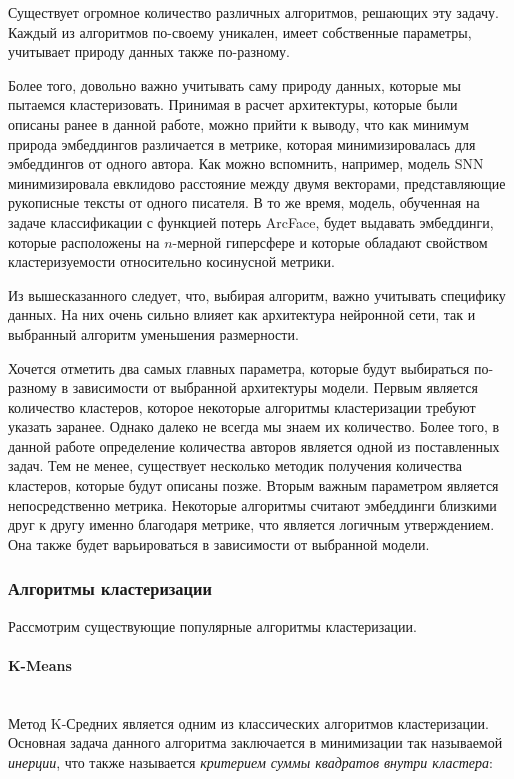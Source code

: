 Существует огромное количество различных алгоритмов, решающих эту задачу. Каждый из алгоритмов по-своему уникален, имеет собственные параметры, учитывает природу данных также по-разному. 

Более того, довольно важно учитывать саму природу данных, которые мы пытаемся кластеризовать. Принимая в расчет архитектуры, которые были описаны ранее в данной работе, можно прийти к выводу, что как минимум природа эмбеддингов различается в метрике, которая минимизировалась для эмбеддингов от одного автора. Как можно вспомнить, например, модель SNN минимизировала евклидово расстояние между двумя векторами, представляющие рукописные тексты от одного писателя. В то же время, модель, обученная на задаче классификации с функцией потерь ArcFace, будет выдавать эмбеддинги, которые расположены на $n$-мерной гиперсфере и которые обладают свойством кластеризуемости относительно косинусной метрики.

Из вышесказанного следует, что, выбирая алгоритм, важно учитывать специфику данных. На них очень сильно влияет как архитектура нейронной сети, так и выбранный алгоритм уменьшения размерности. 

Хочется отметить два самых главных параметра, которые будут выбираться по-разному в зависимости от выбранной архитектуры модели. Первым является количество кластеров, которое некоторые алгоритмы кластеризации требуют указать заранее. Однако далеко не всегда мы знаем их количество. Более того, в данной работе определение количества авторов является одной из поставленных задач. Тем не менее, существует несколько методик получения количества кластеров, которые будут описаны позже. Вторым важным параметром является непосредственно метрика. Некоторые алгоритмы считают эмбеддинги близкими друг к другу именно благодаря метрике, что является логичным утверждением. Она также будет варьироваться в зависимости от выбранной модели.

\subsubsection{Алгоритмы кластеризации}

Рассмотрим существующие популярные алгоритмы кластеризации.

\paragraph{K-Means}\mbox{} \\

Метод K-Средних является одним из классических алгоритмов кластеризации. Основная задача данного алгоритма заключается в минимизации так называемой \textit{инерции}, что также называется \textit{критерием суммы квадратов внутри кластера}:

